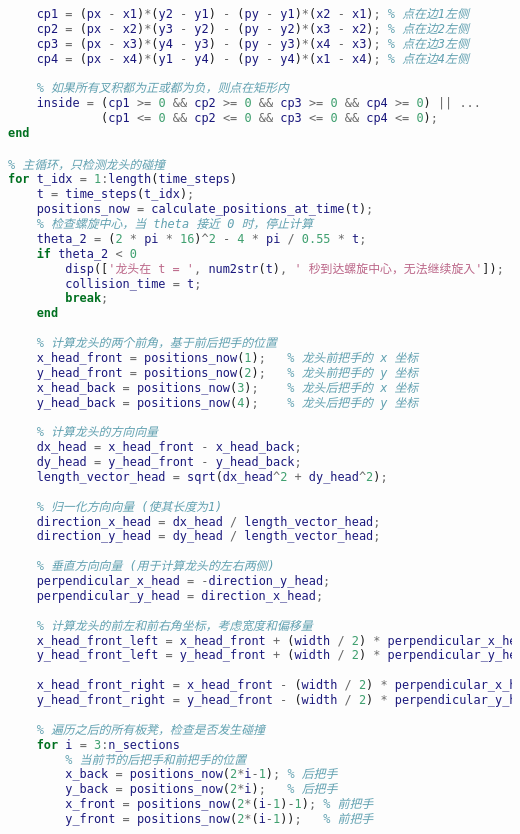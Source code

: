 \documentclass[withoutpreface,bwprint]{cumcmthesis1} %
\begin{document}
\begin{appendices}
\begin{lstlisting}[language=matlab]
    % 点相对于每条边的叉积
    cp1 = (px - x1)*(y2 - y1) - (py - y1)*(x2 - x1); % 点在边1左侧
    cp2 = (px - x2)*(y3 - y2) - (py - y2)*(x3 - x2); % 点在边2左侧
    cp3 = (px - x3)*(y4 - y3) - (py - y3)*(x4 - x3); % 点在边3左侧
    cp4 = (px - x4)*(y1 - y4) - (py - y4)*(x1 - x4); % 点在边4左侧
    
    % 如果所有叉积都为正或都为负，则点在矩形内
    inside = (cp1 >= 0 && cp2 >= 0 && cp3 >= 0 && cp4 >= 0) || ...
             (cp1 <= 0 && cp2 <= 0 && cp3 <= 0 && cp4 <= 0);
end

% 主循环，只检测龙头的碰撞
for t_idx = 1:length(time_steps)
    t = time_steps(t_idx);
    positions_now = calculate_positions_at_time(t);
    % 检查螺旋中心，当 theta 接近 0 时，停止计算
    theta_2 = (2 * pi * 16)^2 - 4 * pi / 0.55 * t;
    if theta_2 < 0
        disp(['龙头在 t = ', num2str(t), ' 秒到达螺旋中心，无法继续旋入']);
        collision_time = t;
        break;
    end
    
    % 计算龙头的两个前角，基于前后把手的位置
    x_head_front = positions_now(1);   % 龙头前把手的 x 坐标
    y_head_front = positions_now(2);   % 龙头前把手的 y 坐标
    x_head_back = positions_now(3);    % 龙头后把手的 x 坐标
    y_head_back = positions_now(4);    % 龙头后把手的 y 坐标
    
    % 计算龙头的方向向量
    dx_head = x_head_front - x_head_back;
    dy_head = y_head_front - y_head_back;
    length_vector_head = sqrt(dx_head^2 + dy_head^2);
    
    % 归一化方向向量 (使其长度为1)
    direction_x_head = dx_head / length_vector_head;
    direction_y_head = dy_head / length_vector_head;
    
    % 垂直方向向量 (用于计算龙头的左右两侧)
    perpendicular_x_head = -direction_y_head;
    perpendicular_y_head = direction_x_head;
    
    % 计算龙头的前左和前右角坐标，考虑宽度和偏移量
    x_head_front_left = x_head_front + (width / 2) * perpendicular_x_head + offset * direction_x_head;
    y_head_front_left = y_head_front + (width / 2) * perpendicular_y_head + offset * direction_y_head;
    
    x_head_front_right = x_head_front - (width / 2) * perpendicular_x_head + offset * direction_x_head;
    y_head_front_right = y_head_front - (width / 2) * perpendicular_y_head + offset * direction_y_head;
    
    % 遍历之后的所有板凳，检查是否发生碰撞
    for i = 3:n_sections
        % 当前节的后把手和前把手的位置
        x_back = positions_now(2*i-1); % 后把手
        y_back = positions_now(2*i);   % 后把手
        x_front = positions_now(2*(i-1)-1); % 前把手
        y_front = positions_now(2*(i-1));   % 前把手
        

\end{lstlisting}
\end{appendices}
\end{document}
